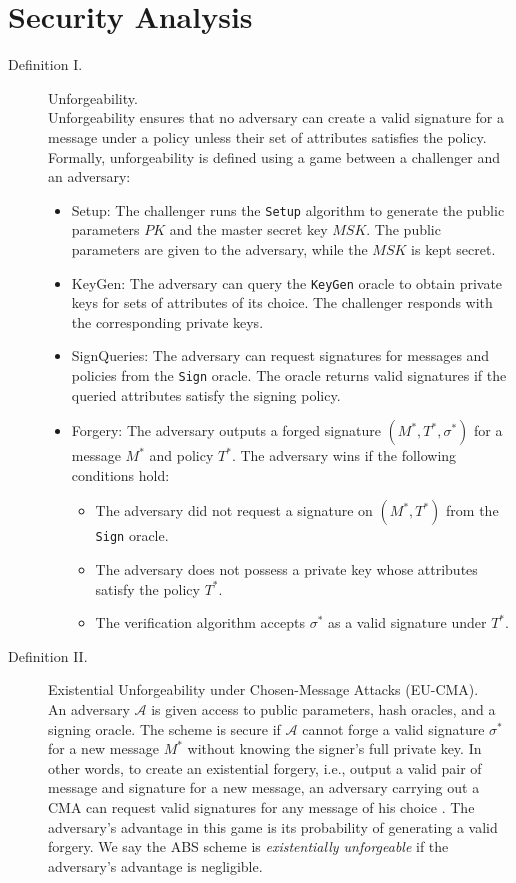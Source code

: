 \section{Security Analysis}
\begin{description}
    \item[Definition I.] Unforgeability.\\
    Unforgeability ensures that no adversary can create a valid signature for a message under a policy unless their set of attributes satisfies the policy.
    Formally, unforgeability is defined using a game between a challenger and an adversary:
    \begin{itemize}
        \item Setup: The challenger runs the \texttt{Setup} algorithm to generate the public parameters $PK$ and the master secret key $MSK$. The public parameters are given to the adversary, while the $MSK$ is kept secret.

        \item KeyGen: The adversary can query the \texttt{KeyGen} oracle to obtain private keys for sets of attributes of its choice. The challenger responds with the corresponding private keys.

        \item SignQueries: The adversary can request signatures for messages and policies from the \texttt{Sign} oracle. The oracle returns valid signatures if the queried attributes satisfy the signing policy.

        \item Forgery: The adversary outputs a forged signature $(M^*, T^*, \sigma^*)$ for a message $M^*$ and policy $T^*$. The adversary wins if the following conditions hold:
        \begin{itemize}
            \item The adversary did not request a signature on $(M^*, T^*)$ from the \texttt{Sign} oracle.
            \item The adversary does not possess a private key whose attributes satisfy the policy $T^*$.
            \item The verification algorithm accepts $\sigma^*$ as a valid signature under $T^*$.
        \end{itemize}
    \end{itemize}

    \item[Definition II.] Existential Unforgeability under Chosen-Message Attacks (EU-CMA).\\
    An adversary $\mathcal{A}$ is given access to public parameters, hash oracles, and a signing oracle.
    The scheme is secure if $\mathcal{A}$ cannot forge a valid signature $\sigma^*$ for a new message $M^*$ without knowing the signer's full private key.
    In other words, to create an existential forgery, i.e., output a valid pair of message and signature for a new message, an adversary carrying out a CMA can request valid signatures for any message of his choice \cite{Goldwasser1988}.
    The adversary's advantage in this game is its probability of generating a valid forgery.
    We say the ABS scheme is \textit{existentially unforgeable} if the adversary's advantage is negligible.


\end{description}
